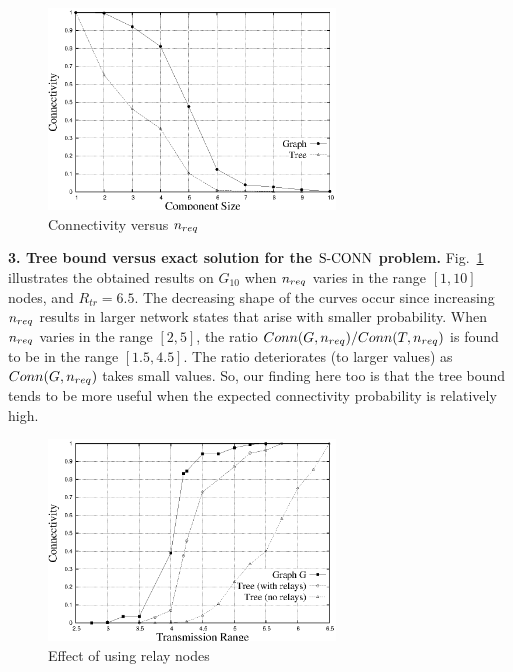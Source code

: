 \noindent
     \begin{figure}[htbp]
     \begin{center}
     \includegraphics[width=3.0in]{conn-vs-nReq.eps}
     \caption{Connectivity versus ${n_{req}}$}
     \label{sim:conn:vs:nreq}
     \end{center}
     \end{figure}

{\bf 3. Tree bound versus exact solution for the ${\mathrm {S\mbox{-}CONN}}$ problem.}
%
Fig.~\ref{sim:conn:vs:nreq} illustrates the obtained results on $G_{10}$
when ${n_{req}}$ varies in the range $[1,10]$ nodes, and $R_{tr}= 6.5$.
%
The decreasing shape of the curves occur since increasing ${n_{req}}$ results
in larger network states that arise with smaller probability.
%
When ${n_{req}}$ varies in the range $[2,5]$, the ratio
$Conn(G,{n_{req}})/Conn(T,{n_{req}})$ is found to be in the range $[1.5,4.5]$.
%
The ratio deteriorates (to larger values) as $Conn(G,{n_{req}})$ takes small
values.
%
So, our finding here too is that the tree bound tends to be more useful
when the expected connectivity probability is relatively high.


\noindent
     \begin{figure}[htbp]
     \begin{center}
     \includegraphics[width=3.0in]{conn-vs-trans-relay.eps}
     \caption{Effect of using relay nodes}
     \label{sim:conn:vs:trans:relay}
     \end{center}
     \end{figure}

